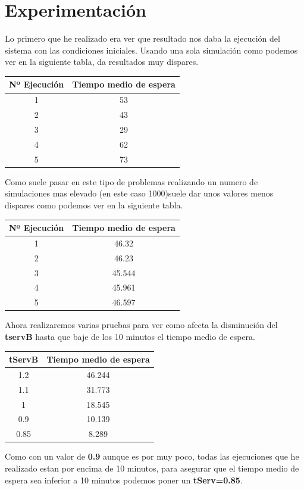 \documentclass[12pt,a4paper]{article}
\begin{document}
\section{Experimentación}
Lo primero que he realizado era ver que resultado nos daba la ejecución del sistema con las condiciones iniciales. Usando una sola simulación como podemos ver en la siguiente tabla, da resultados muy dispares.
\begin{table}[H]
	\centering
\begin{tabular}{|c|c|}
	\hline 
	Nº Ejecución & Tiempo medio de espera \\ 
	\hline 
	1 & 53 \\ 
	\hline 
	2 & 43 \\ 
	\hline 
	3 & 29 \\ 
	\hline 
	4 & 62 \\ 
	\hline 
	5 & 73 \\ 
	\hline 
\end{tabular} 
\end{table}
Como suele pasar en este tipo de problemas realizando un numero de simulaciones mas elevado (en este caso 1000)suele dar unos valores menos dispares como podemos ver en la siguiente tabla.
 \begin{table}[H]
	\centering
\begin{tabular}{|c|c|}
	\hline 
	Nº Ejecución & Tiempo medio de espera \\ 
	\hline 
	1 & 46.32 \\ 
	\hline 
	2 & 46.23 \\ 
	\hline 
	3 & 45.544 \\ 
	\hline 
	4 & 45.961 \\ 
	\hline 
	5 & 46.597 \\ 
	\hline 
\end{tabular} 
\end{table}
Ahora realizaremos varias pruebas para ver como afecta la disminución del \textbf{tservB} hasta que baje de los 10 minutos el tiempo medio de espera. 
 \begin{table}[H]
	\centering
\begin{tabular}{|c|c|}
	\hline 
	tServB & Tiempo medio de espera \\ 
	\hline 
	1.2 & 46.244 \\ 
	\hline 
	1.1 & 31.773 \\ 
	\hline 
	1 & 18.545\\ 
	\hline 
	0.9 & 10.139 \\ 
	\hline 
	0.85 & 8.289 \\ 
	\hline 
\end{tabular}
\end{table}
Como con un valor de \textbf{0.9} aunque es por muy poco, todas las ejecuciones que he realizado estan por encima de 10 minutos, para asegurar que el tiempo medio de espera sea inferior a 10 minutos podemos poner un \textbf{tServ=0.85}. 
\end{document}
